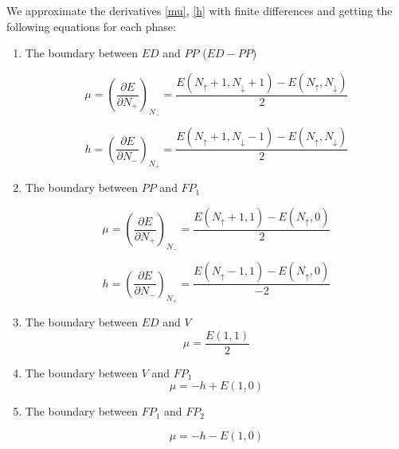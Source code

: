 \documentclass[a0,portrait]{a0poster}
\begin{document}
\begin{multicols}{2}
We approximate the derivatives \eqref{mu}, \eqref{h} with finite differences and getting the following equations for each phase:

\begin{enumerate}
\item The boundary between $ED$ and $PP$ ($ED-PP$)

\begin{equation} \label{ED-PP mu}
\mu = {\left( \frac{\partial E}{\partial N_{+}} \right)}_{N_{-}} = \frac{E(N_{\uparrow} + 1, N_{\downarrow} + 1) - E(N_{\uparrow} ,N_{\downarrow})}{2}
\end{equation}
	
\begin{equation}\label{ED-PP h}
h = {\left( \frac{\partial E}{\partial N_{-}} \right)}_{N_{+}} = \frac{E(N_{\uparrow} + 1, N_{\downarrow} - 1) - E(N_{\uparrow} ,N_{\downarrow})}{2}
\end{equation}

\item The boundary between $PP$ and $FP_1$

\begin{equation} \label{PP-FP1 mu}
\mu = {\left( \frac{\partial E}{\partial N_{+}} \right)}_{N_{-}} = \frac{E(N_{\uparrow} + 1, 1) - E(N_{\uparrow}, 0)}{2}
\end{equation}

\begin{equation} \label{PP-FP2 h}     	
h = {\left( \frac{\partial E}{\partial N_{-}} \right)}_{N_{+}} = \frac{E(N_{\uparrow} - 1, 1) - E(N_{\uparrow}, 0)}{-2}
\end{equation}

\item The boundary between $ED$ and $V$
\begin{equation}
\mu = \frac{E(1, 1)}{2}
\end{equation}
     	
\item The boundary between $V$ and $FP_1$
\begin{equation} \label{V-FP}
\mu = - h + E(1, 0)
\end{equation}
     	
\item The boundary between $FP_1$ and $FP_2$

\begin{equation} \label{FP-FP}
\mu = - h - E(1, 0)
\end{equation}

\end{enumerate}
     

\end{multicols}
\end{document}

